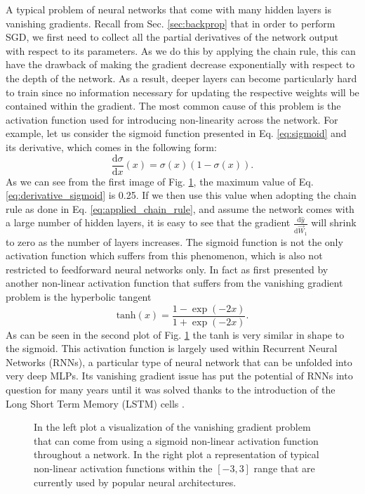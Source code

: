 A typical problem of neural networks that come with many hidden layers is vanishing gradients. Recall from Sec. \ref{sec:backprop} that in order to perform SGD, we first need to collect all the partial derivatives of the network output with respect to its parameters. As we do this by applying the chain rule, this can have the drawback of making the gradient decrease exponentially with respect to the depth of the network. As a result, deeper layers can become particularly hard to train since no information necessary for updating the respective weights will be contained within the gradient. The most common cause of this problem is the activation function used for introducing non-linearity across the network. For example, let us consider the sigmoid function presented in Eq. \ref{eq:sigmoid} and its derivative, which comes in the following form:
\begin{equation}
	\frac{\text{d}\sigma}{\text{d}x}(x) = \sigma(x)(1-\sigma(x)).
	\label{eq:derivative_sigmoid}
\end{equation}
As we can see from the first image of Fig. \ref{fig:activation_functions}, the maximum value of Eq. \ref{eq:derivative_sigmoid} is 0.25. If we then use this value when adopting the chain rule as done in Eq. \ref{eq:applied_chain_rule}, and assume the network comes with a large number of hidden layers, it is easy to see that the gradient $\frac{\text{d}\hat{y}}{\text{d}\vec{W}_1}$ will shrink to zero as the number of layers increases. The sigmoid function is not the only activation function which suffers from this phenomenon, which is also not restricted to feedforward neural networks only. In fact as first presented by \citet{hochreiter1997long} another non-linear activation function that suffers from the vanishing gradient problem is the hyperbolic tangent 
\begin{equation}
	\text{tanh}(x) = \frac{1-\exp(-2x)}{1+\exp(-2x)}.
\end{equation}
As can be seen in the second plot of Fig. \ref{fig:activation_functions} the tanh is very similar in shape to the sigmoid. This activation function is largely used within Recurrent Neural Networks (RNNs), a particular type of neural network that can be unfolded into very deep MLPs. Its vanishing gradient issue has put the potential of RNNs into question for many years until it was solved thanks to the introduction of the Long Short Term Memory (LSTM) cells \cite{hochreiter1997long}. 

\begin{figure}[ht!]
	\centering
	
	\caption{In the left plot a visualization of the vanishing gradient problem that can come from using a sigmoid non-linear activation function throughout a network. In the right plot a representation of typical non-linear activation functions within the $[-3,3]$ range that are currently used by popular neural architectures.}
\label{fig:activation_functions}
\end{figure}

